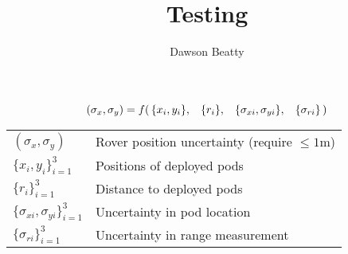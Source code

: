 \documentclass[10pt,letterpaper]{article}
\title{Testing}
\author{Dawson Beatty}
\begin{document}

\begin{equation*}
    (\sigma_x, \sigma_y) = f(\, \{ x_i, y_i \}, \hspace{.3cm} \{ r_i \},\hspace{.3cm} \{ \sigma_{xi}, \sigma_{yi} \}, \hspace{.3cm} \{\sigma_{ri} \} \,)
\end{equation*}

\vspace{1cm}

\renewcommand{\arraystretch}{1.5} 
\begin{tabular}{ll}
    $(\sigma_x, \sigma_y)$ & Rover position uncertainty (require $\leq 1$m) \\
    $\{ x_i, y_i \}_{i=1}^3$ & Positions of deployed pods \\  %
    $\{ r_i \}_{i=1}^3$ & Distance to deployed pods \\ %
    $\{ \sigma_{xi}, \sigma_{yi} \}_{i=1}^3$ & Uncertainty in pod location \\ %
    $\{ \sigma_{ri} \}_{i=1}^3$& Uncertainty in range measurement  
\end{tabular}

\end{document}
